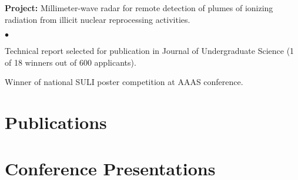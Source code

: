 \documentclass[margin,line]{res}
\let\resumesection\section
\newenvironment{list1}{
  \begin{list}{\ding{113}}{%
      \setlength{\itemsep}{0in}
      \setlength{\parsep}{0in} \setlength{\parskip}{0in}
      \setlength{\topsep}{0in} \setlength{\partopsep}{0in} 
      \setlength{\leftmargin}{0.17in}}}{\end{list}}
\newenvironment{list2}{
  \begin{list}{$\bullet$}{%
      \setlength{\itemsep}{0in}
      \setlength{\parsep}{0in} \setlength{\parskip}{0in}
      \setlength{\topsep}{0in} \setlength{\partopsep}{0in} 
      \setlength{\leftmargin}{0.2in}}}{\end{list}}
\begin{document}
\begin{resume}
\begin{list1}
  \item[] {\bf \small Project:} Millimeter-wave radar for remote detection of
                                plumes of ionizing radiation from illicit
                                nuclear reprocessing activities.
  \begin{list2}
    \item Technical report selected for publication in Journal of Undergraduate
            Science (1 of 18 winners out of 600 applicants).
    \item Winner of national SULI poster competition at AAAS conference.
  \end{list2}
\end{list1}

\section{\sc Publications}

\renewcommand{\section}[2]{}
\renewcommand{\section}{\resumesection}

\section{\sc Conference Presentations}

\renewcommand{\section}[2]{}
\renewcommand{\section}{\resumesection}

%


\end{resume}
\end{document}
